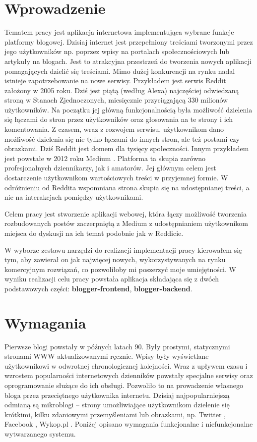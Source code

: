 \documentclass[declaration,shortabstract,polish,inz]{iithesis}
\author         {Oskar Sobczyk}
\date          {\today}                     %
\begin{document}

\chapter{Wprowadzenie}
Tematem pracy jest aplikacja internetowa implementująca wybrane funkcje platformy blogowej. Dzisiaj internet jest przepełniony treściami tworzonymi przez jego użytkowników np. poprzez wpisy na portalach społecznościowych lub artykuły na blogach. Jest to atrakcyjna przestrzeń do tworzenia nowych aplikacji pomagających dzielić się treściami. Mimo dużej konkurencji na rynku nadal istnieje zapotrzebowanie na nowe serwisy. Przykładem jest serwis Reddit \cite{reddit} założony w 2005 roku. Dziś jest piątą (według Alexa) najczęściej odwiedzaną stroną w Stanach Zjednoczonych, miesięcznie przyciągającą 330 milionów użytkowników. Na początku jej główną funkcjonalnością była możliwość dzielenia się łączami do stron przez użytkowników oraz głosowania na te strony i ich komentowania. Z czasem, wraz z rozwojem serwisu, użytkownikom dano możliwość dzielenia się nie tylko łączami do innych stron, ale też postami czy obrazkami. Dziś Reddit jest domem dla tysięcy społeczności. Innym przykładem jest powstałe w 2012 roku Medium \cite{medium}. Platforma ta skupia zarówno profesjonalnych dziennikarzy, jak i amatorów. Jej głównym celem jest dostarczenie użytkownikom wartościowych treści w przyjemnej formie. W odróżnieniu od Reddita wspomniana strona skupia się na udostępnianej treści, a nie na interakcjach pomiędzy użytkownikami.

Celem pracy jest stworzenie aplikacji webowej, która łączy możliwość tworzenia rozbudowanych postów zaczerpniętą z Medium z udostępnianiem użytkownikom miejsca do dyskusji na ich temat podobnie jak w Reddicie.

W wyborze zestawu narzędzi do realizacji implementacji pracy kierowałem się tym, aby zawierał on jak najwięcej nowych, wykorzystywanych na rynku komercyjnym rozwiązań, co pozwoliłoby mi poszerzyć moje umiejętności. W wyniku realizacji celu pracy powstała aplikacja składająca się z dwóch podstawowych części: \textbf{blogger-frontend}, \textbf{blogger-backend}.


\chapter{Wymagania}

Pierwsze blogi powstały w późnych latach 90. Były prostymi, statycznymi stronami WWW aktualizowanymi ręcznie. Wpisy były wyświetlane użytkownikowi w odwrotnej chronologicznej kolejności. Wraz z upływem czasu i wzrostem popularności internetowych dzienników powstały specjalne serwisy oraz oprogramowanie służące do ich obsługi. Pozwoliło to na prowadzenie własnego bloga przez przeciętnego użytkownika internetu. Dzisiaj najpopularniejszą odmianą są mikroblogi – strony umożliwiające użytkownikom dzielenie się krótkimi, kilku zdaniowymi przemyśleniami lub obrazkami, np. Twitter \cite{twitter}, Facebook \cite{facebook}, Wykop.pl \cite{wykop}. Poniżej opisano wymagania funkcjonalne i niefunkcjonalne wytwarzanego systemu.
\end{document}
